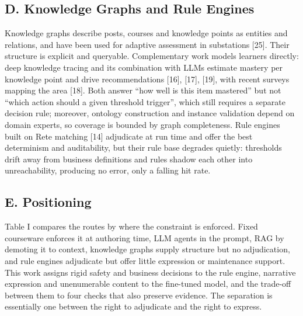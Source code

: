 \documentclass[conference]{IEEEtran}
\begin{document}
\subsection{D. Knowledge Graphs and Rule Engines}

Knowledge graphs describe posts, courses and knowledge points as entities and relations, and have been used for adaptive assessment in substations [25]. Their structure is explicit and queryable. Complementary work models learners directly: deep knowledge tracing and its combination with LLMs estimate mastery per knowledge point and drive recommendations [16], [17], [19], with recent surveys mapping the area [18]. Both answer ``how well is this item mastered'' but not ``which action should a given threshold trigger'', which still requires a separate decision rule; moreover, ontology construction and instance validation depend on domain experts, so coverage is bounded by graph completeness. Rule engines built on Rete matching [14] adjudicate at run time and offer the best determinism and auditability, but their rule base degrades quietly: thresholds drift away from business definitions and rules shadow each other into unreachability, producing no error, only a falling hit rate.


\subsection{E. Positioning}

Table I compares the routes by where the constraint is enforced. Fixed courseware enforces it at authoring time, LLM agents in the prompt, RAG by demoting it to context, knowledge graphs supply structure but no adjudication, and rule engines adjudicate but offer little expression or maintenance support. This work assigns rigid safety and business decisions to the rule engine, narrative expression and unenumerable content to the fine-tuned model, and the trade-off between them to four checks that also preserve evidence. The separation is essentially one between the right to adjudicate and the right to express.
\end{document}

